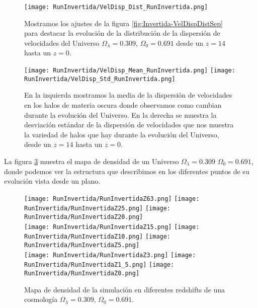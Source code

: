 \begin{figure}[H]
    \centering
    \texttt{[image: RunInvertida/VelDisp\_Dist\_RunInvertida.png]}
    \caption[Distribución de la dispersión de velocidades]{\footnotesize Mostramos los ajustes de la figura \ref{fig:Invertida-VelDispDistSep} para destacar la evolución de la distribución de la dispersión de velocidades del Universo $\Omega_\lambda = 0.309 $, $\Omega_0 = 0.691$ desde un $z=14$ hasta un $z=0$.}
    \label{fig:Invertida-VelDispDist}
\end{figure}

\begin{figure}[H]
    \centering
    \texttt{[image: RunInvertida/VelDisp\_Mean\_RunInvertida.png]}
    \texttt{[image: RunInvertida/VelDisp\_Std\_RunInvertida.png]}
    \caption[Media y desviación estándar de la dispersión de velocidades]{\footnotesize En la izquierda mostramos la media de la dispersión de velocidades en los halos de materia oscura donde observamos como cambian durante la evolución del Universo. En la derecha se muestra la desviación estándar de la dispersión de velocidades que nos muestra la variedad de halos que hay durante la evolución del Universo, desde un $z=14$ hasta un $z=0$.}
    \label{fig:Invertida-VelDispStats}
\end{figure}

La figura \ref{fig:Invertida-DensityMap} muestra el mapa de densidad de un Universo $\Omega_\lambda = 0.309 $ $\Omega_0 = 0.691$, donde podemos ver la estructura que describimos en los diferentes puntos de su evolución vista desde un plano.

\begin{figure}[H]
    \centering

    \texttt{[image: RunInvertida/RunInvertidaZ63.png]}   %
    \texttt{[image: RunInvertida/RunInvertidaZ25.png]}   %
    \texttt{[image: RunInvertida/RunInvertidaZ20.png]}   %
    \\
    \texttt{[image: RunInvertida/RunInvertidaZ15.png]}   %
    \texttt{[image: RunInvertida/RunInvertidaZ10.png]}   %
    \texttt{[image: RunInvertida/RunInvertidaZ5.png]}    %
    \\
    \texttt{[image: RunInvertida/RunInvertidaZ3.png]}    %
    \texttt{[image: RunInvertida/RunInvertidaZ1\_5.png]}  %
    \texttt{[image: RunInvertida/RunInvertidaZ0.png]}    %
    \caption[Mapa de densidad en en diferentes redshift]{ \footnotesize Mapa de densidad de la simulación en diferentes redshifts de una cosmología $\Omega_\lambda = 0.309 $, $\Omega_0 = 0.691$. }
    \label{fig:Invertida-DensityMap}
\end{figure}

